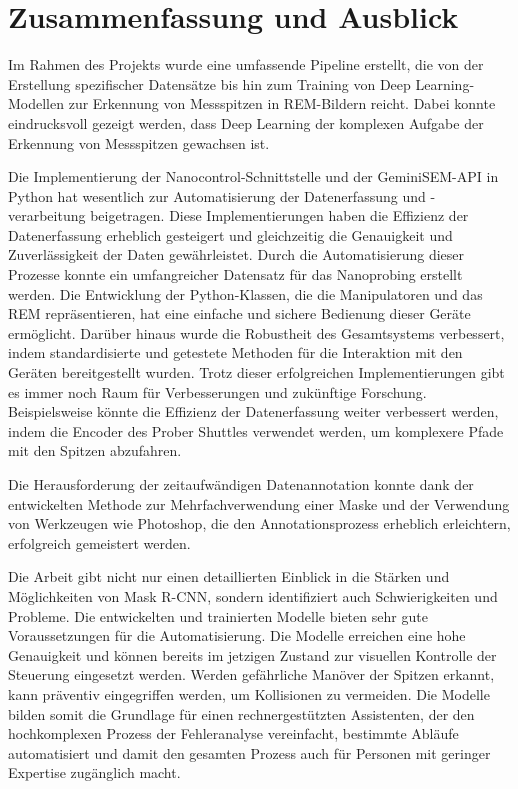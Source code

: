 \chapter{Zusammenfassung und Ausblick}
Im Rahmen des Projekts wurde eine umfassende Pipeline erstellt, die von der Erstellung spezifischer Datensätze bis hin zum Training von Deep Learning-Modellen zur Erkennung von Messspitzen in REM-Bildern reicht. Dabei konnte eindrucksvoll gezeigt werden, dass Deep Learning der komplexen Aufgabe der Erkennung von Messspitzen gewachsen ist.

Die Implementierung der Nanocontrol-Schnittstelle und der GeminiSEM-API in Python hat wesentlich zur Automatisierung der Datenerfassung und -verarbeitung beigetragen. Diese Implementierungen haben die Effizienz der Datenerfassung erheblich gesteigert und gleichzeitig die Genauigkeit und Zuverlässigkeit der Daten gewährleistet. Durch die Automatisierung dieser Prozesse konnte ein umfangreicher Datensatz für das Nanoprobing erstellt werden.
Die Entwicklung der Python-Klassen, die die Manipulatoren und das REM repräsentieren, hat eine einfache und sichere Bedienung dieser Geräte ermöglicht. Darüber hinaus wurde die Robustheit des Gesamtsystems verbessert, indem standardisierte und getestete Methoden für die Interaktion mit den Geräten bereitgestellt wurden.
Trotz dieser erfolgreichen Implementierungen gibt es immer noch Raum für Verbesserungen und zukünftige Forschung. Beispielsweise könnte die Effizienz der Datenerfassung weiter verbessert werden, indem die Encoder des Prober Shuttles verwendet werden, um komplexere Pfade mit den Spitzen abzufahren.

Die Herausforderung der zeitaufwändigen Datenannotation konnte dank der entwickelten Methode zur Mehrfachverwendung einer Maske und der Verwendung von Werkzeugen wie Photoshop, die den Annotationsprozess erheblich erleichtern, erfolgreich gemeistert werden. 

Die Arbeit gibt nicht nur einen detaillierten Einblick in die Stärken und Möglichkeiten von Mask R-CNN, sondern identifiziert auch Schwierigkeiten und Probleme.
Die entwickelten und trainierten Modelle bieten sehr gute Voraussetzungen für die Automatisierung. Die Modelle erreichen eine hohe Genauigkeit und können bereits im jetzigen Zustand zur visuellen Kontrolle der Steuerung eingesetzt werden. Werden gefährliche Manöver der Spitzen erkannt, kann präventiv eingegriffen werden, um Kollisionen zu vermeiden. Die Modelle bilden somit die Grundlage für einen rechnergestützten Assistenten, der den hochkomplexen Prozess der Fehleranalyse vereinfacht, bestimmte Abläufe automatisiert und damit den gesamten Prozess auch für Personen mit geringer Expertise zugänglich macht.

